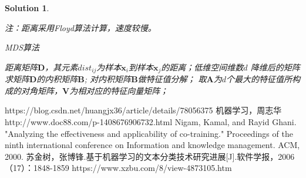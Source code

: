 \documentclass[a4paper,UTF8]{article}
\numberwithin{equation}{section}
\newtheorem*{solution}{Solution}
\begin{document}
\begin{solution}
\begin{enumerate}
    注：距离采用Floyd算法计算，速度较慢。

	\begin{algorithm}[htbp]  
	    \caption{MDS算法}  
	    \begin{algorithmic}[1] %
	 		\Require 距离矩阵$\mathbf{D}$，其元素$dist_{ij}$为样本$\mathbf{x}_i$到样本$\mathbf{x}_j$的距离；低维空间维数$d$
		    \Ensure 降维后的矩阵
		    \State 求矩阵$\mathbf{D}$的内积矩阵$\mathbf{B}$;
		    \State 对内积矩阵$\mathbf{B}$做特征值分解；
		    \State 取$\mathbf{A}$为$d$个最大的特征值所构成的对角矩阵，$\mathbf{V}$为相对应的特征向量矩阵；
	        \State {}
	   \end{algorithmic}  
	\end{algorithm} 
\end{enumerate}

\end{solution}
\newpage
\begin{thebibliography}{}
 https://blog.csdn.net/huangjx36/article/details/78056375
 机器学习，周志华
 http://www.doc88.com/p-1408676906732.html
 Nigam, Kamal, and Rayid Ghani. "Analyzing the effectiveness and applicability of co-training." Proceedings of the ninth international conference on Information and knowledge management. ACM, 2000.
 苏金树，张博锋.基于机器学习的文本分类技术研究进展[J].软件学报，2006（17）：1848-1859
 https://www.xzbu.com/8/view-4873105.htm
\end{thebibliography}
\end{document}
